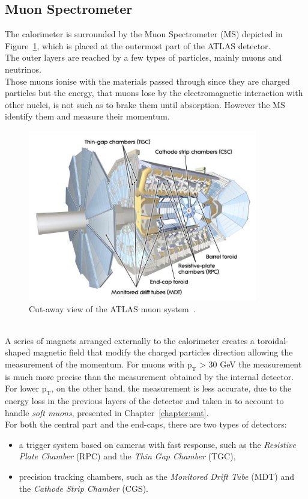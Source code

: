 \FloatBarrier
\subsection{Muon Spectrometer}
\label{sec:MuonSpec}
The calorimeter is surrounded by the Muon Spectrometer (MS) depicted in Figure~\ref{fig:MS}, which is placed at the outermost part of the ATLAS detector.\\
The outer layers are reached by a few types of particles, mainly muons and neutrinos.\\
Those muons ionise  with the materials passed through since they are charged particles but the energy, that muons lose by the electromagnetic interaction
with other nuclei, is not such as to brake them until absorption. 
However the MS  identify them and measure their momentum.
\begin{figure}[h]
	\centering
	\includegraphics[width=10cm]{Chapters/CH2/figures/MS}
	\caption{Cut-away view of the ATLAS muon system~\cite{ATLAS}.}
	\label{fig:MS}
\end{figure}
\\A series of magnets arranged externally to the calorimeter creates a toroidal-shaped magnetic field
that modify the charged particles direction allowing the measurement of the momentum.
For muons with $\mathrm{p_T}$ > 30 GeV the measurement is much more precise than the measurement obtained by the internal detector. 
For lower $\mathrm{p_T}$, on the other hand, the measurement is less accurate, due to the 
energy loss in the previous layers of the detector and taken in to account to handle \textit{soft muons}, presented in Chapter~\ref{chapter:smt}.\\
For both the central part and the end-caps,  there are two types of detectors:
\begin{itemize}
	\item a trigger system based on cameras with fast response, such as the \textit{Resistive Plate Chamber} (RPC) and the \textit{Thin Gap Chamber} (TGC), 
	\item precision tracking chambers, such as the \textit{Monitored Drift Tube} (MDT) and the \textit{Cathode Strip Chamber} (CGS).
\end{itemize}
